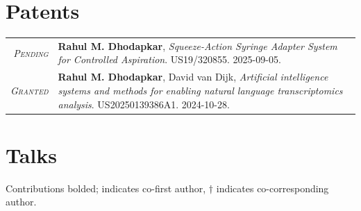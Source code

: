 \documentclass[a4paper,10pt]{article}
\begin{document}
\section{Patents}

\begin{tabular}{rp{11cm}}
 \textit{\textsc{Pending}}& {\bf Rahul M. Dhodapkar}, {\it Squeeze-Action Syringe Adapter System for Controlled Aspiration}. US19/320855. 2025-09-05.
 \\
 \textit{\textsc{Granted}}& {\bf Rahul M. Dhodapkar}, David van Dijk, {\it Artificial intelligence systems and methods for enabling natural language transcriptomics analysis}. US20250139386A1. 2024-10-28.
 \\
\end{tabular}

\newpage
\section{Talks}
Contributions bolded; {\bf *} indicates co-first author, {\bf $\dag$} indicates co-corresponding author. 
\end{document}
